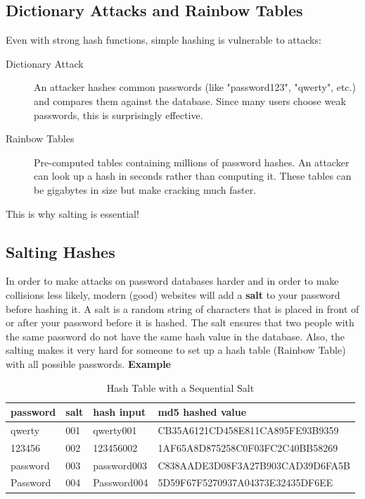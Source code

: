 \documentclass[11pt,a4paper]{report}
\begin{document}
\subsection{Dictionary Attacks and Rainbow Tables}

Even with strong hash functions, simple hashing is vulnerable to attacks:

\begin{description}
    \item[Dictionary Attack] An attacker hashes common passwords (like "password123", "qwerty", etc.) and compares them against the database. Since many users choose weak passwords, this is surprisingly effective.
    \item[Rainbow Tables] Pre-computed tables containing millions of password hashes. An attacker can look up a hash in seconds rather than computing it. These tables can be gigabytes in size but make cracking much faster.
\end{description}

This is why salting is essential!

\subsection{Salting Hashes}

In order to make attacks on password databases harder and in order to make collisions less likely, modern (good) websites will add a \textbf{salt} to your password before hashing it.
A salt is a random string of characters that is placed in front of or after your password before it is hashed.
The salt ensures that two people with the same password do not have the same hash value in the database.
Also, the salting makes it very hard for someone to set up a hash table (Rainbow Table) with all possible passwords.
\textbf{Example}
\begin{table}[h]
\centering
\begin{tabular}{|l|l|l|l|}
\hline
password & salt & hash input & md5 hashed value \\
\hline
qwerty & 001 & qwerty001 & CB35A6121CD458E811CA895FE93B9359 \\
123456 & 002 & 123456002 & 1AF65A8D875258C0F03FC2C40BB58269 \\
password & 003 & password003 & C838AADE3D08F3A27B903CAD39D6FA5B \\
Password & 004 & Password004 & 5D59F67F5270937A04373E32435DF6EE \\
\hline
\end{tabular}
\caption{Hash Table with a Sequential Salt}
\end{table}
\end{document}
